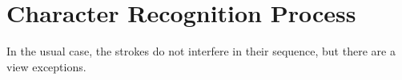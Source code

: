 
\section{Character Recognition Process}
\label{sec:hwre:characterrecognitionprocess}
In the usual case, the strokes do not interfere in their sequence, but there are
a view exceptions.

  





